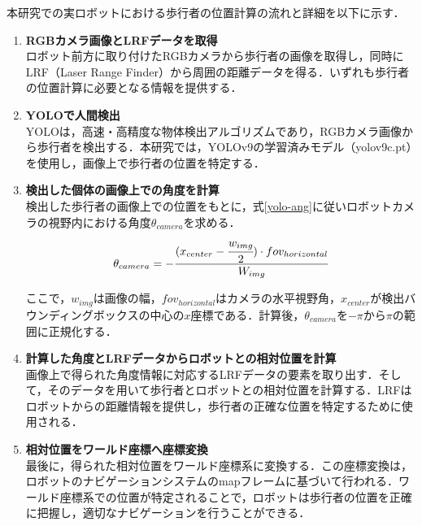 \newpage

本研究での実ロボットにおける歩行者の位置計算の流れと詳細を以下に示す．

\begin{enumerate}
  \item \textbf{RGBカメラ画像とLRFデータを取得} \\
  ロボット前方に取り付けたRGBカメラから歩行者の画像を取得し，同時にLRF（Laser Range Finder）から周囲の距離データを得る．いずれも歩行者の位置計算に必要となる情報を提供する．

  \item \textbf{YOLOで人間検出} \\
  YOLO\cite{redmon2016you-yolo}は，高速・高精度な物体検出アルゴリズムであり，RGBカメラ画像から歩行者を検出する．本研究では，YOLOv9\cite{wang2025yolov9}の学習済みモデル（yolov9c.pt）を使用し，画像上で歩行者の位置を特定する．

  \item \textbf{検出した個体の画像上での角度を計算} \\
  検出した歩行者の画像上での位置をもとに，式\eqref{yolo-ang}に従いロボットカメラの視野内における角度$\theta_{camera}$を求める．
  \begin{equation}
    \theta_{camera} = - \cfrac{(x_{center} - \cfrac{w_{img}}{2}) \cdot fov_{horizontal}}{W_{img}} \label{yolo-ang}
  \end{equation}

  ここで，$w_{img}$は画像の幅，$fov_{horizontal}$はカメラの水平視野角，$x_{center}$が検出バウンディングボックスの中心の$x$座標である．計算後，$\theta_{camera}$を$-\pi \text{から} \pi$の範囲に正規化する．

  \item \textbf{計算した角度とLRFデータからロボットとの相対位置を計算} \\
  画像上で得られた角度情報に対応するLRFデータの要素を取り出す．そして，そのデータを用いて歩行者とロボットとの相対位置を計算する．LRFはロボットからの距離情報を提供し，歩行者の正確な位置を特定するために使用される．

  \item \textbf{相対位置をワールド座標へ座標変換} \\
  最後に，得られた相対位置をワールド座標系に変換する．この座標変換は，ロボットのナビゲーションシステムのmapフレームに基づいて行われる．ワールド座標系での位置が特定されることで，ロボットは歩行者の位置を正確に把握し，適切なナビゲーションを行うことができる．
\end{enumerate}

